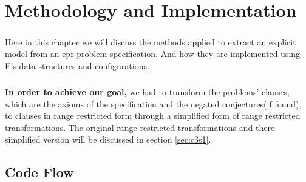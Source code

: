 \chapter{Methodology and Implementation}\label{chap:meth_and_impl}

	\paragraph{} 
	Here in this chapter we will discuss the methods applied to extract an explicit model from an \ac{epr} problem specification. And how they are implemented using E's data structures and configurations.

	\paragraph{} 
	\textbf{In order to achieve our goal,} we had to transform the problems' clauses, which are the axioms of the specification and the negated conjectures(if found), to clauses in range restricted form through a simplified form of range restricted transformations. The original range restricted transformations and there simplified version will be discussed in section \ref{sec:c3s1}.  

	
	
	\section{Code Flow}
